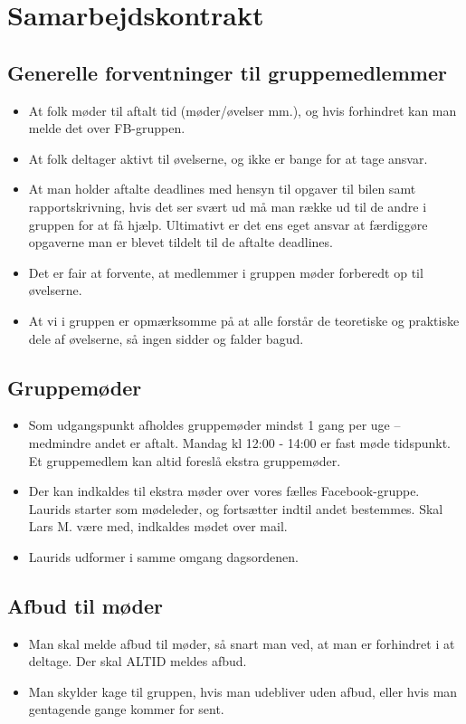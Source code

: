 \chapter{Samarbejdskontrakt}

\section{Generelle forventninger til gruppemedlemmer}
\begin{itemize}
	\item At folk møder til aftalt tid (møder/øvelser mm.), og hvis forhindret kan man melde det over FB-gruppen.
	\item At folk deltager aktivt til øvelserne, og ikke er bange for at tage ansvar.
	\item At man holder aftalte deadlines med hensyn til opgaver til bilen samt rapportskrivning, hvis det ser svært ud må man række ud til de andre i gruppen for at få hjælp. Ultimativt er det ens eget ansvar at færdiggøre opgaverne man er blevet tildelt til de aftalte deadlines.
	\item Det er fair at forvente, at medlemmer i gruppen møder forberedt op til øvelserne.
	\item At vi i gruppen er opmærksomme på at alle forstår de teoretiske og praktiske dele af øvelserne, så ingen sidder og falder bagud.
\end{itemize}



\section{Gruppemøder}
\begin{itemize}
	\item Som udgangspunkt afholdes gruppemøder mindst 1 gang per uge – medmindre andet er aftalt. Mandag kl 12:00 - 14:00 er fast møde tidspunkt. Et gruppemedlem kan altid foreslå ekstra gruppemøder.
	\item Der kan indkaldes til ekstra møder over vores fælles Facebook-gruppe. Laurids starter som mødeleder, og fortsætter indtil andet bestemmes. Skal Lars M. være med, indkaldes mødet over mail. 
	\item Laurids udformer i samme omgang dagsordenen. 
\end{itemize}

\section{Afbud til møder}
\begin{itemize}
	\item Man skal melde afbud til møder, så snart man ved, at man er forhindret i at deltage. Der skal ALTID meldes afbud. 
	\item Man skylder kage til gruppen, hvis man udebliver uden afbud, eller hvis man gentagende gange kommer for sent.
\end{itemize}

